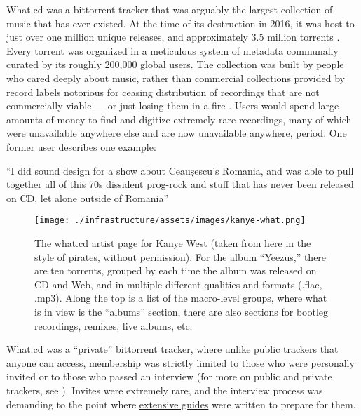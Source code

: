 What.cd was a bittorrent tracker that was arguably the largest
collection of music that has ever existed. At the time of its
destruction in 2016, it was host to just over one million unique
releases, and approximately 3.5 million torrents
\citep{dunhamWhatCDLegacy2018} . Every torrent was organized in a
meticulous system of metadata communally curated by its roughly 200,000
global users. The collection was built by people who cared deeply about
music, rather than commercial collections provided by record labels
notorious for ceasing distribution of recordings that are not
commercially viable --- or just losing them in a fire \citep{rosenDayMusicBurned2019} . Users would spend large amounts of money
to find and digitize extremely rare recordings, many of which were
unavailable anywhere else and are now unavailable anywhere, period. One
former user describes one example:

\begin{leftbar}
``I did sound design for a show about Ceaușescu's Romania, and was able
to pull together all of this 70s dissident prog-rock and stuff that has
never been released on CD, let alone outside of Romania'' \citep{sonnadEulogyWhatCd2016} 
\end{leftbar}

\begin{figure*}
\texttt{[image: ./infrastructure/assets/images/kanye-what.png]}
\label{fig:whatcd} 
\caption{The
what.cd artist page for Kanye West (taken from
\href{https://qz.com/840661/what-cd-is-gone-a-eulogy-for-the-greatest-music-collection-in-the-world/}{here}
in the style of pirates, without permission). For the album ``Yeezus,''
there are ten torrents, grouped by each time the album was released on
CD and Web, and in multiple different qualities and formats (.flac,
.mp3). Along the top is a list of the macro-level groups, where what is
in view is the ``albums'' section, there are also sections for bootleg
recordings, remixes, live albums, etc.}
\end{figure*}

What.cd was a ``private'' bittorrent tracker, where unlike public
trackers that anyone can access, membership was strictly limited to
those who were personally invited or to those who passed an interview
(for more on public and private trackers, see \citep{meulpolderPublicPrivateBitTorrent} ). Invites were extremely rare,
and the interview process was demanding to the point where
\href{https://opentrackers.org/whatinterviewprep.com/index.html}{extensive
guides} were written to prepare for them.

